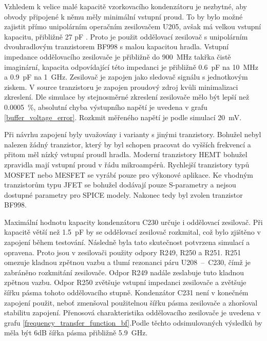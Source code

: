 Vzhledem k velice malé kapacitě vzorkovacího kondenzátoru je nezbytné, aby obvody připojené k němu měly minimální vstupní proud. To by bylo možné zajistit přímo unipolárním operačním zesilovačem U205, avšak má velkou vstupní kapacitu, přibližně 27 pF \cite{oscilloscopefrontend}. Proto je použit oddělovací zesilovač s unipolárním dvouhradlovým tranzistorem BF998 s malou kapacitou hradla. Vstupní impedance oddělovacího zesilovače je přibližně do \SI{900}{\mega\hertz} takřka čistě imaginární, kapacita odpovídající této impedanci je přibližně \SI{0.6}{\pico\farad} na \SI{10}{\mega\hertz} a \SI{0.9}{\pico\farad} na \SI{1}{\giga\hertz}. Zesilovač je zapojen jako sledovač signálu s jednotkovým ziskem. V source tranzistoru je zapojen proudový zdroj kvůli minimalizaci zkreslení. Dle simulace by stejnosměrné zkreslení zesilovače mělo být lepší než \SI{0.0005}{\%}, absolutní chyba výstupního napětí je uvedena v grafu \ref{buffer_voltage_error}. Rozkmit měřeného napětí je podle simulací \SI{20}{\milli\volt}.

Při návrhu zapojení byly uvažovány i varianty s jinými tranzistory. Bohužel nebyl nalezen žádný tranzistor, který by byl  schopen pracovat do vyšších frekvencí a přitom měl nízký vstupní proudl hradla. Moderní tranzistory HEMT bohužel zpravidla mají vstupní proud v řádu mikroampérů. Rychlejší tranzistory typů MOSFET nebo MESFET se vyrábí pouze pro výkonové aplikace. Ke vhodným tranzistorům typu JFET se bohužel dodávají pouze S-parametry a nejsou dostupné parametry pro SPICE modely. Nakonec tedy byl zvolen tranzistor BF998. 

Maximální hodnotu kapacity kondenzátoru C230 určuje i oddělovací zesilovač. Při kapacitě větší než \SI{1.5}{\pico\farad} by se oddělovací zesilovač rozkmital, což bylo zjištěno v zapojení během testování. Následně byla tato skutečnost potvrzena simulací a opravena. Proto jsou v zesilovači použity odpory R249, R250 a R251. R251 omezuje kladnou zpětnou vazbu a tlumí rezonanci páru U208~--~C230, čímž je zabráněno rozkmitání zesilovače. Odpor R249 nadále zeslabuje tuto kladnou zpětnou vazbu. Odpor R250 zvětšuje vstupní impedanci zesilovače a zvětšuje šířku pásma tohoto oddělovacího stupně. Kondenzátor C231 není v konečném zapojení použit, neboť zmenšoval použitelnou šířku pásma zesilovače a zhoršoval stabilitu zapojení. Přenosová charakteristika oddělovacího zesilovače je uvedena v grafu \ref{frequency_transfer_function_bf}.Podle těchto odsimulovaných výsledků by měla být 6\si{\deci\bel} šířka pásma přibližně \SI{5.9}{\giga\hertz}.

